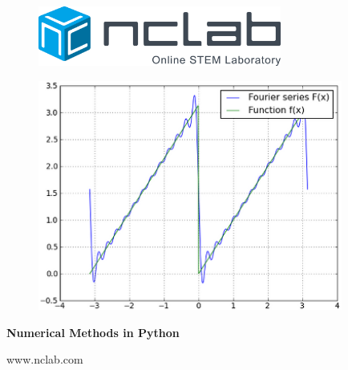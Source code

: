 \documentclass{article}
\begin{document}
\large

\vbox{}
\begin{figure}[!ht]
\includegraphics[width=8cm]{img/logo.png}
\vspace{25mm}
\end{figure}

\begin{figure}[!ht]
\begin{center}
\hspace{-7mm}
\includegraphics[width=10cm]{img/numerical-frontpage.png}
\vspace{25mm}
\end{center}
\end{figure}

\centerline{\Huge \bf Numerical Methods in Python}

\vfill

\centerline{\Large www.nclab.com}

\newpage




\section*{}
\small


\end{document}
